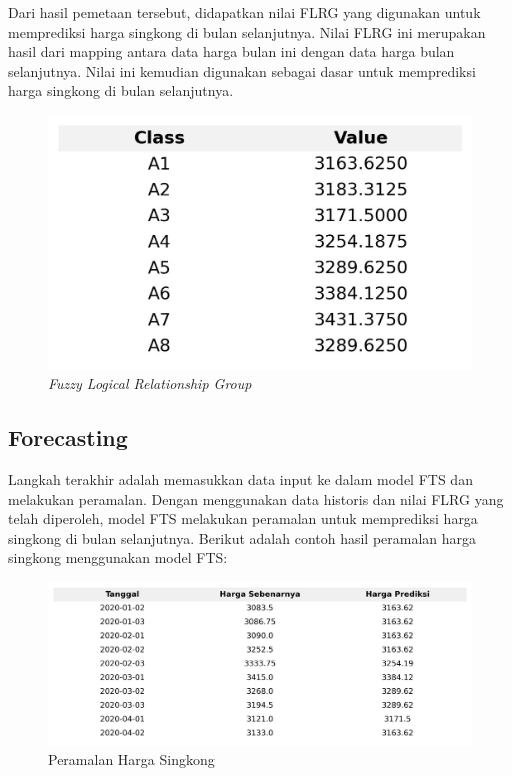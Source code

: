 \documentclass[conference]{IEEEtran}
\begin{document}
Dari hasil pemetaan tersebut, didapatkan nilai FLRG yang digunakan untuk memprediksi harga singkong di bulan selanjutnya. Nilai FLRG ini merupakan hasil dari mapping antara data harga bulan ini dengan data harga bulan selanjutnya. Nilai ini kemudian digunakan sebagai dasar untuk memprediksi harga singkong di bulan selanjutnya.

\begin{figure}[H]
    \centering
    \includegraphics[width=\columnwidth]{images/flrg_table.jpg} 
    \caption{\textit{Fuzzy Logical Relationship Group}}
\end{figure}

\subsection{Forecasting}
Langkah terakhir adalah memasukkan data input ke dalam model FTS dan melakukan peramalan. Dengan menggunakan data historis dan nilai FLRG yang telah diperoleh, model FTS melakukan peramalan untuk memprediksi harga singkong di bulan selanjutnya. Berikut adalah contoh hasil peramalan harga singkong menggunakan model FTS:
\begin{figure}[H]
    \centering
    \includegraphics[width=\columnwidth]{images/tabel_perbandingan_harga.jpg} 
    \caption{Peramalan Harga Singkong}
\end{figure}
\end{document}

